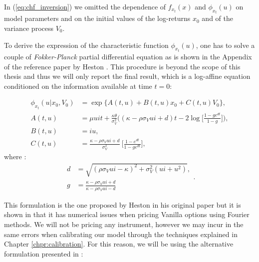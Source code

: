 In (\ref{eq:chf_inversion}) we omitted the dependence of $f_{x_t}(x)$ and $\phi_{x_t}(u)$ on model parameters and on the initial values of the log-returns $x_0$ and of the variance process $V_0$. 

\bigskip

To derive the expression of the characteristic function $\phi_{x_t}(u)$, one has to solve a couple of \textit{Fokker-Planck} partial differential equation as is shown in the Appendix of the reference paper by Heston \citep{HESTON93}. This procedure is beyond the scope of this thesis and thus we will only report the final result, which is a log-affine equation conditioned on the information available at time $t = 0$:

\begin{subequations}
\begin{align}
\label{eq:heston_chf+ABC}
	\phi_{x_t}(u| x_0, V_0) &= \exp\{A(t,u) + B(t,u) x_0 + C(t,u) V_0\}\nonumber, \\
	A(t,u) &= \mu u i t +  \frac{\kappa\theta}{\sigma_V^2} \bigg( (\kappa - \rho\sigma_V u i +d)t - 2 \log\Big[  \frac{1-ge^{dt}}{1-g} \Big] \bigg),\\
	B(t,u) &= i u, \\
	C(t,u)&= \frac{\kappa - \rho\sigma_V u i +d}{\sigma_V^2} \:\Big[\frac{1-e^{dt}}{1-ge^{dt}}\Big],
\end{align}
\end{subequations} 
where :
\begin{equation*}
\begin{split}
d&=\sqrt{(\rho \sigma_V u i - \kappa)^2 + \sigma_V^2(u i + u^2)},\\
g&= \frac{\kappa - \rho\sigma_V u i + d}{\kappa - \rho\sigma_V u i - d}
\end{split}.
\end{equation*} 



This formulation is the one proposed by Heston in his original paper \citep{HESTON93} but it is shown in \citep{HESTONTRAP}  that it has numerical issues when  pricing Vanilla options using Fourier methods. We will not be pricing any instrument, however we may incur in the same errors when calibrating our model through the techniques explained in Chapter \ref{chpr:calibration}. For this reason, we will be using the alternative formulation presented in \citep{HESTONTRAP}:



